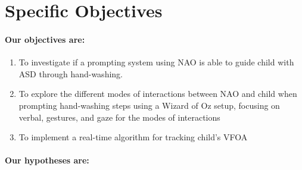 \section{Specific Objectives}

\paragraph{Our objectives are:}
\begin{enumerate}
	\item To investigate if a prompting system using NAO is able to guide child with ASD through hand-washing.
	
	\item To explore the different modes of interactions between NAO and child when prompting hand-washing steps using a Wizard of Oz setup, focusing on verbal, gestures, and gaze for the modes of interactions
	
	\item To implement a real-time algorithm for tracking child's VFOA
\end{enumerate}



\paragraph{Our hypotheses are:}








